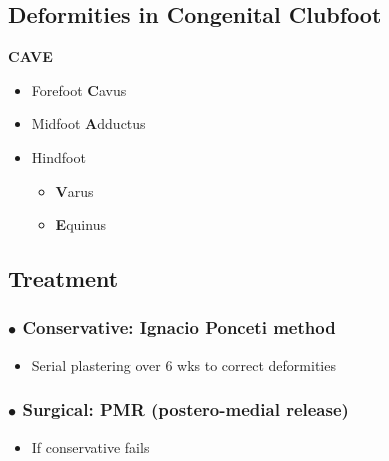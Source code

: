 \documentclass[
  12pt,
]{memoir}
\providecommand{\tightlist}{%
  \setlength{\itemsep}{0pt}\setlength{\parskip}{0pt}}
\begin{document}
\hypertarget{deformities-in-congenital-clubfoot}{%
\subsection{Deformities in Congenital
Clubfoot}\label{deformities-in-congenital-clubfoot}}

\textbf{CAVE}

\begin{itemize}
\tightlist
\item
  Forefoot \textbf{C}avus
\item
  Midfoot \textbf{A}dductus
\item
  Hindfoot

  \begin{itemize}
  \tightlist
  \item
    \textbf{V}arus
  \item
    \textbf{E}quinus
  \end{itemize}
\end{itemize}

\hypertarget{treatment-1}{%
\subsection{Treatment}\label{treatment-1}}

\hypertarget{bullet-conservative-ignacio-ponceti-method}{%
\subsubsection{\texorpdfstring{\(\bullet\) Conservative: Ignacio Ponceti
method}{\textbackslash bullet Conservative: Ignacio Ponceti method}}\label{bullet-conservative-ignacio-ponceti-method}}

\begin{itemize}
\tightlist
\item
  Serial plastering over 6 wks to correct deformities
\end{itemize}

\hypertarget{bullet-surgical-pmr-postero-medial-release}{%
\subsubsection{\texorpdfstring{\(\bullet\) Surgical: PMR (postero-medial
release)}{\textbackslash bullet Surgical: PMR (postero-medial release)}}\label{bullet-surgical-pmr-postero-medial-release}}

\begin{itemize}
\tightlist
\item
  If conservative fails
\end{itemize}
\end{document}
